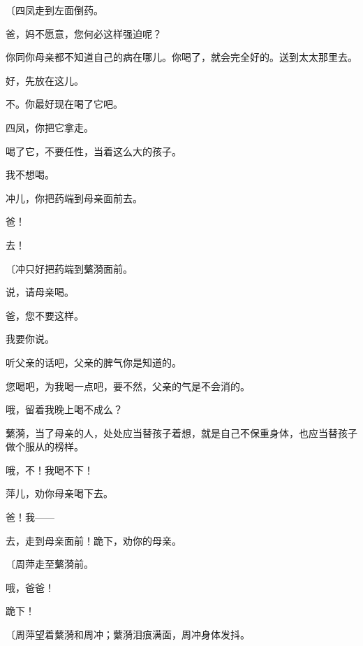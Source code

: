 {\fangsong〔四凤走到左面倒药。}

爸，妈不愿意，您何必这样强迫呢？

你同你母亲都不知道自己的病在哪儿。你喝了，就会完全好的。送到太太那里去。

好，先放在这儿。

不。你最好现在喝了它吧。

四凤，你把它拿走。

喝了它，不要任性，当着这么大的孩子。

我不想喝。

冲儿，你把药端到母亲面前去。

爸！

去！

{\fangsong〔冲只好把药端到蘩漪面前。}

说，请母亲喝。

爸，您不要这样。

我要你说。

听父亲的话吧，父亲的脾气你是知道的。

您喝吧，为我喝一点吧，要不然，父亲的气是不会消的。

哦，留着我晚上喝不成么？

蘩漪，当了母亲的人，处处应当替孩子着想，就是自己不保重身体，也应当替孩子做个服从的榜样。

哦，不！我喝不下！

萍儿，劝你母亲喝下去。

爸！我——

去，走到母亲面前！跪下，劝你的母亲。

{\fangsong〔周萍走至蘩漪前。}

哦，爸爸！

跪下！

{\fangsong〔周萍望着蘩漪和周冲；蘩漪泪痕满面，周冲身体发抖。}

